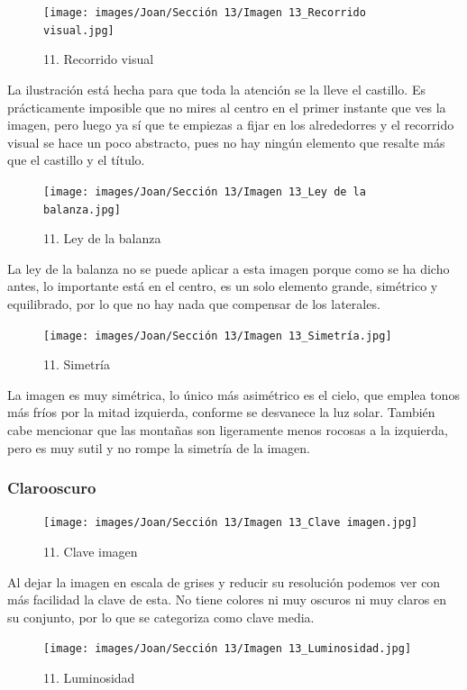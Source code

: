 \documentclass[12pt]{article}
\begin{document}
        \begin{figure}[H]
          \centering
          \texttt{[image: images/Joan/Sección 13/Imagen 13\_Recorrido visual.jpg]}
          \caption{\small 11. Recorrido visual}
        \end{figure}
        La ilustración está hecha para que toda la atención se la lleve el castillo. Es prácticamente imposible que no mires al centro en el primer instante que ves la imagen, pero luego ya sí que te empiezas a fijar en los alrededorres y el recorrido visual se hace un poco abstracto, pues no hay ningún elemento que resalte más que el castillo y el título. 

    \begin{figure}[H]
          \centering
          \texttt{[image: images/Joan/Sección 13/Imagen 13\_Ley de la balanza.jpg]}
          \caption{\small 11. Ley de la balanza}
        \end{figure}
        La ley de la balanza no se puede aplicar a esta imagen porque como se ha dicho antes, lo importante está en el centro, es un solo elemento grande, simétrico y equilibrado, por lo que no hay nada que compensar de los laterales. 

    \begin{figure}[H]
          \centering
          \texttt{[image: images/Joan/Sección 13/Imagen 13\_Simetría.jpg]}
          \caption{\small 11. Simetría}
        \end{figure}
        La imagen es muy simétrica, lo único más asimétrico es el cielo, que emplea tonos más fríos por la mitad izquierda, conforme se desvanece la luz solar. También cabe mencionar que las montañas son ligeramente menos rocosas a la izquierda, pero es muy sutil y no rompe la simetría de la imagen. 

            \subsubsection{Clarooscuro}
            \begin{figure}[H]
          \centering
          \texttt{[image: images/Joan/Sección 13/Imagen 13\_Clave imagen.jpg]}
          \caption{\small 11. Clave imagen}
        \end{figure}
        Al dejar la imagen en escala de grises y reducir su resolución podemos ver con más facilidad la clave de esta. No tiene colores ni muy oscuros ni muy claros en su conjunto, por lo que se categoriza como clave media. 

        \begin{figure}[H]
          \centering
          \texttt{[image: images/Joan/Sección 13/Imagen 13\_Luminosidad.jpg]}
          \caption{\small 11. Luminosidad}
        \end{figure}
\end{document}

